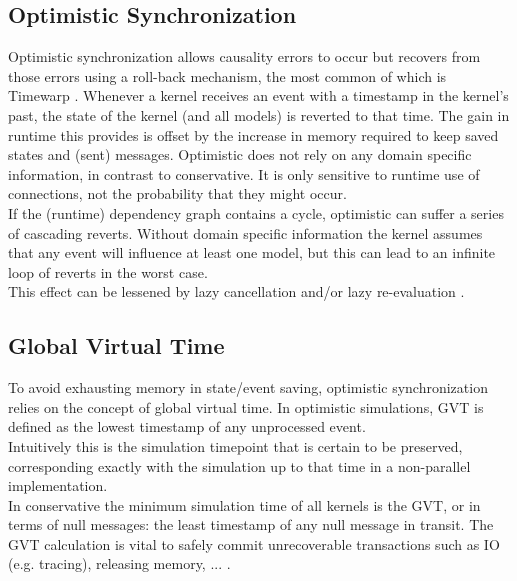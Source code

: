 \subsection{Optimistic Synchronization}
Optimistic synchronization allows causality errors to occur but recovers from those errors using a roll-back mechanism, the most common of which is Timewarp \cite{Jefferson:1985:VT:3916.3988}.
Whenever a kernel receives an event with a timestamp in the kernel's past, the state of the kernel (and all models) is reverted to that time. The gain in runtime this provides is offset by the increase in memory required to keep saved states and (sent) messages.
Optimistic does not rely on any domain specific information, in contrast to conservative. It is only sensitive to runtime use of connections, not the probability that they might occur. %
\\
If the (runtime) dependency graph contains a cycle, optimistic can suffer a series of cascading reverts. Without domain specific information the kernel assumes that any event will influence at least one model, but this can lead to an infinite loop of reverts in the worst case.\\
This effect can be lessened by lazy cancellation and/or lazy re-evaluation \cite{FujimotoBook}.
\subsection{Global Virtual Time}
To avoid exhausting memory in state/event saving, optimistic synchronization relies on the concept of global virtual time\cite{Jefferson:1985:VT:3916.3988}. In optimistic simulations, GVT is defined as the lowest timestamp of any unprocessed event. \\ Intuitively this is the simulation timepoint that is certain to be preserved, corresponding exactly with the simulation up to that time in a non-parallel implementation.\\
In conservative the minimum simulation time of all kernels is the GVT, or in terms of null messages: the least timestamp of any null message in transit.
The GVT calculation is vital to safely commit unrecoverable transactions such as IO (e.g. tracing), releasing memory, ... .

